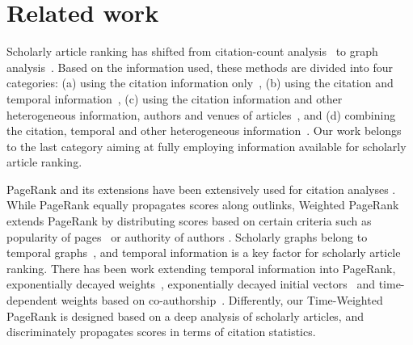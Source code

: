 
\section{Related work} \label{sec-related}



Scholarly article ranking has shifted from citation-count analysis~\cite{Garfield471,Hirsch15112005} to graph analysis~\cite{Waltman2014,Jiang12-MRank,Liang16AAAI,Li08TSRanking,Wang13AAAI,WalkerXKM07,sayyadi09,
Wang16TIST,Ng11KDD}.
Based on the information used, these methods are divided into four categories: (a) using the citation information only~\cite{Garfield471,Hirsch15112005,Ng11KDD}, (b) using the citation and temporal information~\cite{Li08TSRanking,WalkerXKM07}, (c) using the citation information and other heterogeneous information, \eg authors and venues of articles~\cite{Jiang12-MRank,Liang16AAAI}, and (d) combining the citation, temporal and other heterogeneous information~\cite{sayyadi09,Wang16TIST,Wang13AAAI}.
Our work belongs to the last category aiming at fully employing information available for scholarly article ranking.
%



PageRank \cite{Brin98:PageRank} and its extensions have been extensively used for citation analyses \cite{Waltman2014}. While PageRank equally propagates scores along outlinks, Weighted PageRank extends PageRank by distributing scores based on certain criteria such as popularity of pages~\cite{Xing04:WPR} or authority of authors \cite{Ding11}.
Scholarly graphs belong to temporal graphs~\cite{temporalgraph}, and temporal information is a key factor for scholarly article ranking.
There has been work extending temporal information into PageRank, \eg exponentially decayed weights~\cite{Li08TSRanking}, exponentially decayed initial vectors~\cite{WalkerXKM07} and time-dependent weights based on co-authorship~\cite{FIALA2012370}.
Differently, our Time-Weighted PageRank is designed based on a deep analysis of scholarly articles, and discriminately propagates scores in terms of citation statistics.


